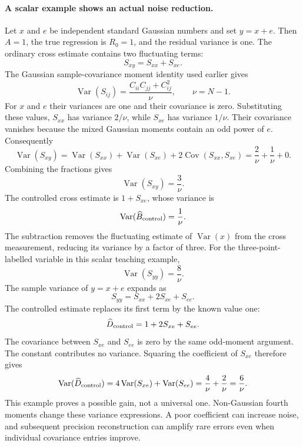 \documentclass[11pt]{article}
\newcommand{\Var}{\operatorname{Var}}
\newcommand{\cov}{\operatorname{Cov}}
\begin{document}
\paragraph{A scalar example shows an actual noise reduction.}
Let $x$ and $e$ be independent standard Gaussian numbers and set $y=x+e$.
Then $A=1$, the true regression is $R_0=1$, and the residual variance is
one. The ordinary cross estimate contains two fluctuating terms:
\begin{equation}
 S_{xy}=S_{xx}+S_{xe}.
\end{equation}
The Gaussian sample-covariance moment identity used earlier gives
\begin{equation}
 \Var(S_{ij})=\frac{C_{ii}C_{jj}+C_{ij}^2}{\nu},\qquad \nu=N-1.
\end{equation}
For $x$ and $e$ their variances are one and their covariance is zero.
Substituting these values, $S_{xx}$ has variance $2/\nu$, while $S_{xe}$ has variance $1/\nu$.
Their covariance vanishes because the mixed Gaussian moments contain an
odd power of $e$. Consequently
\begin{equation}
 \Var(S_{xy})=\Var(S_{xx})+\Var(S_{xe})
              +2\cov(S_{xx},S_{xe})
              =\frac{2}{\nu}+\frac{1}{\nu}+0.
\end{equation}
Combining the fractions gives
\begin{equation}
 \Var(S_{xy})=\frac{3}{\nu}.
\end{equation}
The controlled cross estimate is $1+S_{xe}$, whose variance is
\begin{equation}
 \Var(\widehat B_{\rm control})=\frac{1}{\nu}.
\end{equation}
The subtraction removes the fluctuating estimate of $\Var(x)$ from the
cross measurement, reducing its variance by a factor of three. For the
three-point-labelled variable in this scalar teaching example,
\begin{equation}
 \Var(S_{yy})=\frac{8}{\nu}.
\end{equation}
The sample variance of $y=x+e$ expands as
\begin{equation}
 S_{yy}=S_{xx}+2S_{xe}+S_{ee}.
\end{equation}
The controlled estimate replaces its first term by the known value one:
\begin{equation}
 \widehat D_{\rm control}=1+2S_{xe}+S_{ee}.
\end{equation}
The covariance between $S_{xe}$ and $S_{ee}$ is zero by the same odd-moment
argument. The constant contributes no variance. Squaring the coefficient
of $S_{xe}$ therefore gives
\begin{equation}
 \Var(\widehat D_{\rm control})
 =4\Var(S_{xe})+\Var(S_{ee})
 =\frac{4}{\nu}+\frac{2}{\nu}=\frac{6}{\nu}.
\end{equation}
This example proves a possible gain, not a universal one. Non-Gaussian
fourth moments change these variance expressions. A poor coefficient can
increase noise, and subsequent precision reconstruction can amplify rare
errors even when individual covariance entries improve.
\end{document}
